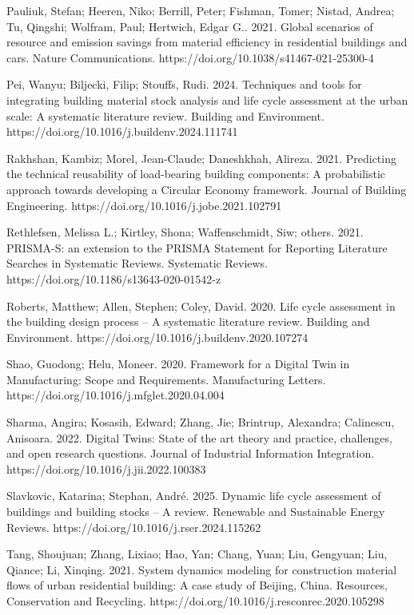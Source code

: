 Pauliuk, Stefan; Heeren, Niko; Berrill, Peter; Fishman, Tomer; Nistad, Andrea; Tu, Qingshi; Wolfram, Paul; Hertwich, Edgar G.. 2021. Global scenarios of resource and emission savings from material efficiency in residential buildings and cars. Nature Communications. https://doi.org/10.1038/s41467-021-25300-4

Pei, Wanyu; Biljecki, Filip; Stouffs, Rudi. 2024. Techniques and tools for integrating building material stock analysis and life cycle assessment at the urban scale: A systematic literature review. Building and Environment. https://doi.org/10.1016/j.buildenv.2024.111741

Rakhshan, Kambiz; Morel, Jean-Claude; Daneshkhah, Alireza. 2021. Predicting the technical reusability of load-bearing building components: A probabilistic approach towards developing a Circular Economy framework. Journal of Building Engineering. https://doi.org/10.1016/j.jobe.2021.102791

Rethlefsen, Melissa L.; Kirtley, Shona; Waffenschmidt, Siw; others. 2021. PRISMA-S: an extension to the PRISMA Statement for Reporting Literature Searches in Systematic Reviews. Systematic Reviews. https://doi.org/10.1186/s13643-020-01542-z

Roberts, Matthew; Allen, Stephen; Coley, David. 2020. Life cycle assessment in the building design process -- A systematic literature review. Building and Environment. https://doi.org/10.1016/j.buildenv.2020.107274

Shao, Guodong; Helu, Moneer. 2020. Framework for a Digital Twin in Manufacturing: Scope and Requirements. Manufacturing Letters. https://doi.org/10.1016/j.mfglet.2020.04.004

Sharma, Angira; Kosasih, Edward; Zhang, Jie; Brintrup, Alexandra; Calinescu, Anisoara. 2022. Digital Twins: State of the art theory and practice, challenges, and open research questions. Journal of Industrial Information Integration. https://doi.org/10.1016/j.jii.2022.100383

Slavkovic, Katarina; Stephan, André. 2025. Dynamic life cycle assessment of buildings and building stocks -- A review. Renewable and Sustainable Energy Reviews. https://doi.org/10.1016/j.rser.2024.115262

Tang, Shoujuan; Zhang, Lixiao; Hao, Yan; Chang, Yuan; Liu, Gengyuan; Liu, Qiance; Li, Xinqing. 2021. System dynamics modeling for construction material flows of urban residential building: A case study of Beijing, China. Resources, Conservation and Recycling. https://doi.org/10.1016/j.resconrec.2020.105298

